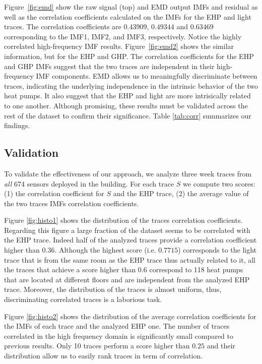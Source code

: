 Figure~\ref{fig:emd} show the raw signal (top) and EMD output IMFs and residual as well as the 
correlation coefficients calculated on the IMFs for the EHP and
light traces.  The correlation coefficients are $0.43909$, $0.49344$ and $0.63469$ corresponding to the IMF1, 
IMF2, and IMF3, respectively.  Notice the highly correlated high-frequency IMF results.
Figure~\ref{fig:emd2} shows the similar information, but for the EHP and GHP.
The correlation coefficients for the EHP and GHP IMFs suggest that the two traces are independent in their 
high-frequency IMF components.
EMD allows us to meaningfully discriminate between traces, indicating the underlying independence in the intrinsic
behavior of the two heat pumps.  It also suggest that the EHP and light are more intrisically related
to one another.  Although promising, these results must be validated across the rest of the
dataset to confirm their significance.  Table \ref{tab:corr} summarizes our findings.

\subsection{Validation}
To validate the effectiveness of our approach, we analyze three week traces from \emph{all} 
674 sensors deployed in the building.
For each trace $S$ we compute two scores: (1) the correlation coefficient for $S$ and the EHP trace, (2) the average value of the two traces IMFs correlation coefficients.

Figure \ref{fig:histo1} shows the distribution of the traces correlation coefficients.
Regarding this figure a large fraction of the dataset seems to be correlated with the EHP trace.
Indeed half of the analyzed traces provide a correlation coefficient higher than $0.36$.
Although the highest score (i.e. $0.7715$) corresponds to the light trace that is from the same room as the EHP trace thus actually related to it, all the traces that achieve a score higher than $0.6$  correspond to 118 heat pumps that are located at different floors and are independent from the analyzed EHP trace.
Moreover, the distribution of the traces is almost uniform, thus, discriminating correlated traces is a laborious task.

Figure \ref{fig:histo2} shows the distribution of the average correlation coefficients for the IMFs of each trace and the analyzed EHP one.
The number of traces correlated in the high frequency domain is significantly small compared to previous results. 
Only 10 traces perform a score higher than $0.25$ and their distribution allow us to easily rank traces in term of correlation.

